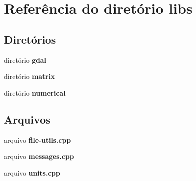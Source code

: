 \section{Referência do diretório libs}
\label{dir_12805f428932ccf36313a69f5c30dd5a}
\subsection*{Diretórios}
\begin{DoxyCompactItemize}
\item 
diretório {\bf gdal}
\item 
diretório {\bf matrix}
\item 
diretório {\bf numerical}
\end{DoxyCompactItemize}
\subsection*{Arquivos}
\begin{DoxyCompactItemize}
\item 
arquivo {\bf file-\/utils.\+cpp}
\item 
arquivo {\bf messages.\+cpp}
\item 
arquivo {\bf units.\+cpp}
\end{DoxyCompactItemize}
